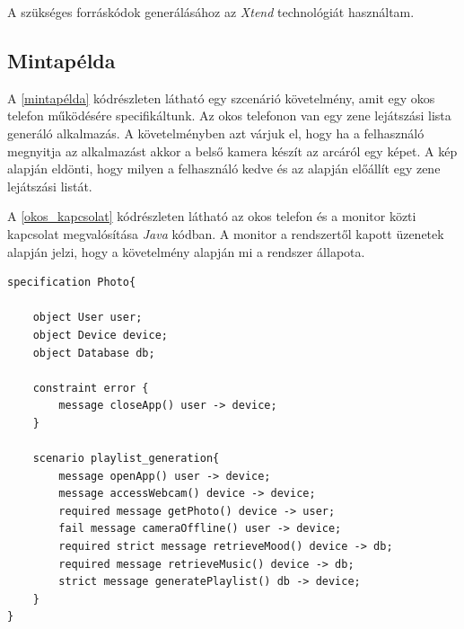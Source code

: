 A szükséges forráskódok generálásához az \textit{Xtend} technológiát használtam.

\clearpage\subsection{Mintapélda}

A \ref{mintapélda} kódrészleten látható egy szcenárió követelmény, amit egy okos telefon működésére specifikáltunk.
Az okos telefonon van egy zene lejátszási lista generáló alkalmazás.
A követelményben azt várjuk el, hogy ha a felhasználó megnyitja az alkalmazást akkor a belső kamera készít az arcáról egy képet.
A kép alapján eldönti, hogy milyen a felhasználó kedve és az alapján előállít egy zene lejátszási listát.

A \ref{okos_kapcsolat} kódrészleten látható az okos telefon és a monitor közti kapcsolat megvalósítása \textit{Java} kódban.
A monitor a rendszertől kapott üzenetek alapján jelzi, hogy a követelmény alapján mi a rendszer állapota.

\begin{lstlisting}[frame=single, float=ht!, caption={Okos telefon működésére megadott szcenárió követelmény.},captionpos=b, label=mintapélda]
specification Photo{

	object User user;
	object Device device;
	object Database db;

	constraint error {
		message closeApp() user -> device;
	}

	scenario playlist_generation{
		message openApp() user -> device;
		message accessWebcam() device -> device;
		required message getPhoto() device -> user;
		fail message cameraOffline() user -> device;
		required strict message retrieveMood() device -> db;
		required message retrieveMusic() device -> db;
		strict message generatePlaylist() db -> device;
	}
}
\end{lstlisting}

